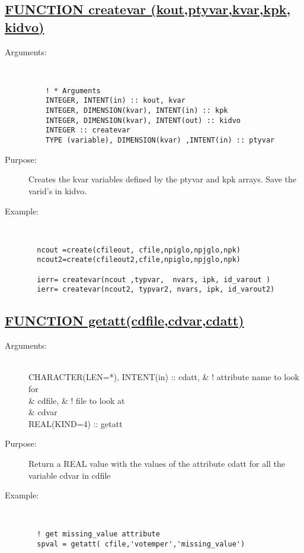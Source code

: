 \documentclass[a4paper,11pt]{article}
\begin{document}
\subsection*{\underline{ FUNCTION createvar (kout,ptyvar,kvar,kpk, kidvo) }}
\begin{description}
\item[Arguments:] \ \\
\begin{small} \begin{verbatim}
    ! * Arguments
    INTEGER, INTENT(in) :: kout, kvar
    INTEGER, DIMENSION(kvar), INTENT(in) :: kpk
    INTEGER, DIMENSION(kvar), INTENT(out) :: kidvo
    INTEGER :: createvar
    TYPE (variable), DIMENSION(kvar) ,INTENT(in) :: ptyvar
\end{verbatim} \end{small}
\item[Purpose:] Creates the kvar variables defined by the ptyvar and kpk arrays. Save the varid's in kidvo. 
\item[Example:] \ \\
\begin{verbatim}
  ncout =create(cfileout, cfile,npiglo,npjglo,npk)
  ncout2=create(cfileout2,cfile,npiglo,npjglo,npk)

  ierr= createvar(ncout ,typvar,  nvars, ipk, id_varout )
  ierr= createvar(ncout2, typvar2, nvars, ipk, id_varout2)
\end{verbatim}

\end{description}
\newpage

\subsection*{\underline{FUNCTION getatt(cdfile,cdvar,cdatt)  }}
\begin{description}
\item[Arguments:] \ \\
    CHARACTER(LEN=*), INTENT(in) :: cdatt,   \&   ! attribute name to look for\\
         \&                         cdfile,  \&   ! file to look at\\
         \&                         cdvar\\
    REAL(KIND=4) :: getatt
\item[Purpose:] Return a REAL value with the values of the attribute cdatt for all the variable cdvar  in cdfile
\item[Example:] \ \\
\begin{verbatim}
  ! get missing_value attribute
  spval = getatt( cfile,'votemper','missing_value')
\end{verbatim}
\end{description}
\newpage
\end{document}
